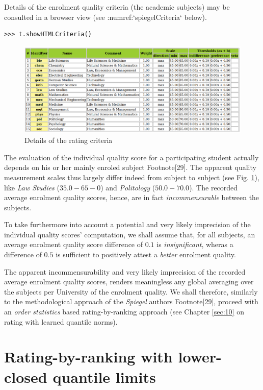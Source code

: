Details of the enrolment quality criteria (the academic subjects) may be consulted in a browser view (see :numref:`spiegelCriteria` below).

\begin{lstlisting}
>>> t.showHTMLCriteria()
\end{lstlisting}
 
\begin{figure}[h]
\includegraphics[width=12cm]{Figures/spiegelCriteria.png}
\caption{Details of the rating criteria}
\label{fig:14.2}       %
\end{figure}
The evaluation of the individual quality score for a participating student actually depends on his or her mainly enroled subject Footnote[29]. The apparent quality measurement scales thus largely differ indeed from subject to subject (see Fig. \ref{fig:14.2}), like \emph{Law Studies} ($35.0 - 65-0$) and \emph{Politology} ($50.0 - 70.0$). The recorded average enrolment quality scores, hence, are in fact \emph{incommensurable} between the subjects.

To take furthermore into account a potential and very likely imprecision of the individual quality scores' computation, we shall assume that, for all subjects, an average enrolment quality score difference of $0.1$ is \emph{insignificant}, wheras a difference of $0.5$ is sufficient to positively attest a \emph{better} enrolment quality.

The apparent incommensurability and very likely imprecision of the recorded average enrolment quality scores, renders meaningless any global averaging over the subjects per University of the enrolment quality. We shall therefore, similarly to the methodological approach of the \emph{Spiegel} authors Footnote[29], proceed with an \emph{order statistics} based rating-by-ranking approach (see Chapter \ref{sec:10} on rating with learned quantile norms).

\section{Rating-by-ranking with lower-closed quantile limits}
\label{sec:14.1}

